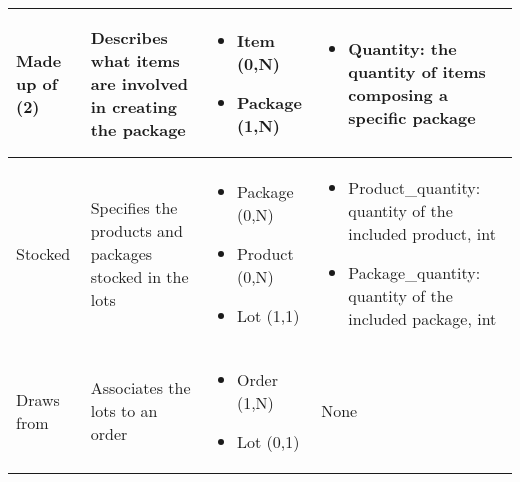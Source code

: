 \begin{longtable}{|p{}|p{} |p{}|p{} |}
Made up of (2) & Describes what items are involved in creating the package & \begin{itemize}
	\vspace{-1em}
	\item Item (0,N)
	\item Package (1,N)
\end{itemize}
&  \begin{itemize}
      	\vspace{-1em}
       	\item Quantity:   the quantity of items composing a specific package
   \end{itemize} \\\hline


Stocked  & Specifies the products and packages stocked in the lots & \begin{itemize}
	\vspace{-1em}
	\item Package (0,N)
	\item Product (0,N)
	\item Lot (1,1)
\end{itemize}
&  \begin{itemize}
         	\vspace{-1em}
          	\item Product\_quantity:   quantity of the included product, int
            \item Package\_quantity:   quantity of the included package, int
      \end{itemize} \\\hline


Draws from & Associates the lots to an order & \begin{itemize}
	\vspace{-1em}
	\item Order (1,N)
	\item Lot (0,1)
\end{itemize}
&  None \\\hline

\end{longtable}